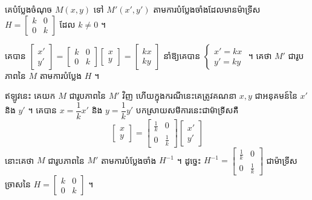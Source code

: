 \begin{example}[ឧទាហរណ៍]
គេបំប្លែងចំណុច $M(x, y)$ ទៅ $M'(x', y')$ តាមការបំប្លែងចាំងដែលមានម៉ាទ្រីស $H = \begin{bmatrix} k & 0\\ 0 & k \end{bmatrix}$ ដែល $k \ne 0$ ។
\end{example}
គេបាន $\begin{bmatrix} x'\\ y' \end{bmatrix} = \begin{bmatrix} k & 0\\ 0 & k \end{bmatrix}\begin{bmatrix} x\\ y \end{bmatrix} = \begin{bmatrix} kx\\ ky \end{bmatrix}$ នាំឱ្យគេបាន $\begin{cases} x' = kx\\ y' = ky \end{cases}$ ។ គេថា $M'$ ជារូបភាពនៃ $M$ តាមការបំប្លែង $H$ ។

ឥឡូវនេះ គេយក $M$ ជារូបភាពនៃ $M'$ វិញ ហើយក្នុងករណីនេះគេត្រូវគណនា $x, y$ ជាអនុគមន៍នៃ $x'$ និង $y'$ ។ គេបាន $x = \dfrac{1}{k}x'$ និង $y = \dfrac{1}{k}y'$ បកស្រាយសមីការនេះជាម៉ាទ្រីសគឺ
\[ \begin{bmatrix} x\\ y \end{bmatrix} = \begin{bmatrix} \frac{1}{k} & 0\\ 0 & \frac{1}{k} \end{bmatrix}\begin{bmatrix} x'\\ y' \end{bmatrix} \]
នោះគេថា $M$ ជារូបភាពនៃ $M'$ តាមការបំប្លែងចាំង $H^{-1}$ ។ ដូច្នេះ $H^{-1} = \begin{bmatrix} \frac{1}{k} & 0\\ 0 & \frac{1}{k} \end{bmatrix}$ ជាម៉ាទ្រីសច្រាសនៃ $H = \begin{bmatrix} k & 0\\ 0 & k \end{bmatrix}$ ។

